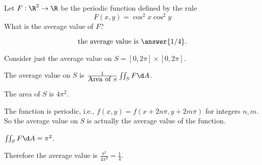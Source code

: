 \documentclass{ximera}
\author{Jim Fowler}
\begin{document}
\begin{exercise}
  
  Let $F : \R^2 \to \R$ be the periodic function defined by the rule
  \[
    F(x,y) = \cos^2 x \cos^2 y
  \]
  What is the average value of $F$?
  \begin{prompt}
    \[
      \mbox{the average value is } \answer{1/4}.
    \]
  \end{prompt}

  \begin{hint}
    Consider just the average value on $S = [0,2\pi] \times [0,2\pi]$.
  \end{hint}

  \begin{hint}
    The average value on $S$ is $\frac{1}{\mbox{Area of }S} \iint_S F \d A$.
  \end{hint}

  \begin{hint}
    The area of $S$ is $4\pi^2$.
  \end{hint}

  \begin{hint}
    The function is periodic, i.e., $f(x,y) = f(x+2n\pi, y+2m\pi)$ for integers $n,m$.  So the average value on $S$ is actually the average value of the function.
  \end{hint}

  \begin{hint}
    $\iint_S F \d A = \pi^2$.
  \end{hint}

  \begin{hint}
    Therefore the average value is $\frac{\pi^2}{4\pi^2} = \frac{1}{4}$.
  \end{hint}          
  
\end{exercise}
\end{document}
